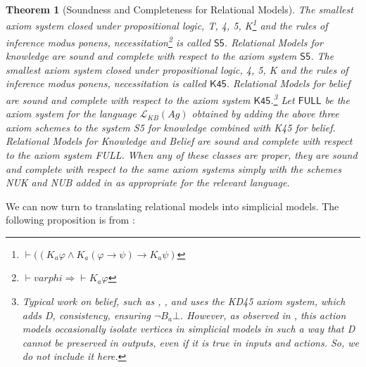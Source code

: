 \documentclass[11pt]{article}
\newtheorem{theorem}{Theorem}[section]
\theoremstyle{definition}
\renewcommand{\L}{\mathcal{L}}
\newcommand{\full}{\textsf{FULL}}
\begin{document}
	\begin{theorem}[Soundness and Completeness for Relational Models]
	The smallest axiom system closed under propositional logic, \textsf{T}, \textsf{4}, \textsf{5}, \textsf{K}\footnote{$\vdash ((K_a\varphi\wedge K_a(\varphi\rightarrow\psi)\rightarrow K_a\psi)$} and the rules of inference modus ponens, necessitation\footnote{$\vdash varphi\Rightarrow\vdash K_a\varphi$} is called $\textsf{S5}$. Relational Models for knowledge are sound and complete with respect to the axiom system $\textsf{S5}$. The smallest axiom system closed under propositional logic, \textsf{4}, \textsf{5}, \textsf{K} and the rules of inference modus ponens, necessitation is called $\textsf{K45}$. Relational Models for belief are sound and complete with respect to the axiom system $\textsf{K45}$.\footnote{Typical work on belief, such as \cite{HGD}, \cite{SimpBel}, and \cite{BelSimp} uses the \textsf{KD45} axiom system, which adds \textsf{D}, consistency, ensuring $\neg B_a\bot$. However, as observed in \cite{SimpBelRev}, this action models occasionally isolate vertices in simplicial models in such a way that \textsf{D} cannot be preserved in outputs, even if it is true in inputs and actions. So, we do not include it here.} Let $\full$ be the axiom system for the language $\L_{KB}(Ag)$ obtained by adding the above three axiom schemes to the system \textsf{S5} for knowledge combined with \textsf{K45} for belief. Relational Models for Knowledge and Belief are sound and complete with respect to the axiom system \full. When any of these classes are proper, they are sound and complete with respect to the same axiom systems simply with the schemes \textsf{NUK} and \textsf{NUB} added in as appropriate for the relevant language.
	\end{theorem}

	We can now turn to translating relational models into simplicial models. The following proposition is from \cite{BelSimp}:
	
\end{document}
